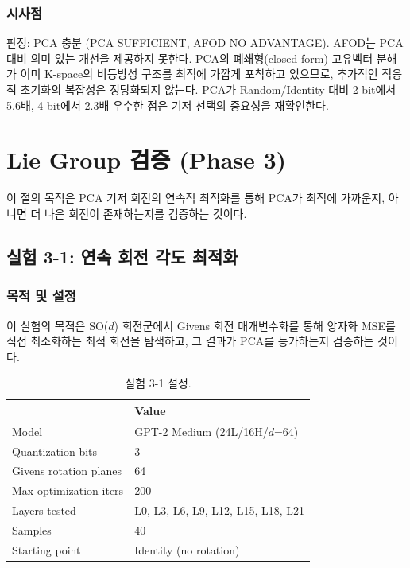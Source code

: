 \documentclass[11pt,a4paper]{article}
\begin{document}
\subsubsection{시사점}

판정: \textcolor{success}{PCA 충분 (PCA SUFFICIENT, AFOD NO ADVANTAGE)}.
AFOD는 PCA 대비 의미 있는 개선을 제공하지 못한다.
PCA의 폐쇄형(closed-form) 고유벡터 분해가 이미 K-space의 비등방성 구조를 최적에 가깝게 포착하고 있으므로, 추가적인 적응적 초기화의 복잡성은 정당화되지 않는다.
PCA가 Random/Identity 대비 2-bit에서 5.6배, 4-bit에서 2.3배 우수한 점은 기저 선택의 중요성을 재확인한다.

\section{Lie Group 검증 (Phase 3)}

이 절의 목적은 PCA 기저 회전의 연속적 최적화를 통해 PCA가 최적에 가까운지, 아니면 더 나은 회전이 존재하는지를 검증하는 것이다.

\subsection{실험 3-1: 연속 회전 각도 최적화}

\subsubsection{목적 및 설정}

이 실험의 목적은 SO($d$) 회전군에서 Givens 회전 매개변수화를 통해 양자화 MSE를 직접 최소화하는 최적 회전을 탐색하고, 그 결과가 PCA를 능가하는지 검증하는 것이다.

\begin{table}[H]
\centering
\caption{실험 3-1 설정.}
\label{tab:exp31_setup}
\begin{tabular}{ll}
\toprule
\textbf{} & \textbf{Value} \\
\midrule
Model & GPT-2 Medium (24L/16H/$d$=64) \\
Quantization bits & 3 \\
Givens rotation planes & 64 \\
Max optimization iters & 200 \\
Layers tested & L0, L3, L6, L9, L12, L15, L18, L21 \\
Samples & 40 \\
Starting point & Identity (no rotation) \\
\bottomrule
\end{tabular}
\end{table}
\end{document}
